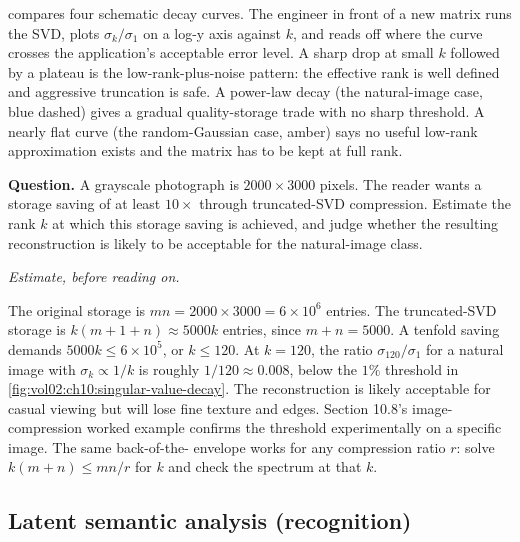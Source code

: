 

 compares four schematic
decay curves. The engineer in front of a new matrix runs the SVD,
plots $\sigma_{k}/\sigma_{1}$ on a log-y axis against $k$, and reads
off where the curve crosses the application's acceptable error level.
A sharp drop at small $k$ followed by a plateau is the
low-rank-plus-noise pattern: the effective rank is well defined and
aggressive truncation is safe. A power-law decay (the natural-image
case, blue dashed) gives a gradual quality-storage trade with no
sharp threshold. A nearly flat curve (the random-Gaussian case,
amber) says no useful low-rank approximation exists and the matrix
has to be kept at full rank.

\begin{estimation}
\textbf{Question.} A grayscale photograph is $2000 \times 3000$
pixels. The reader wants a storage saving of at least $10\times$
through truncated-SVD compression. Estimate the rank $k$ at which
this storage saving is achieved, and judge whether the resulting
reconstruction is likely to be acceptable for the natural-image
class.

\smallskip
\textit{Estimate, before reading on.}

\smallskip
The original storage is $mn = 2000 \times 3000 = 6 \times 10^{6}$
entries. The truncated-SVD storage is $k(m + 1 + n) \approx 5000 k$
entries, since $m + n = 5000$. A tenfold saving demands
$5000 k \leq 6 \times 10^{5}$, or $k \leq 120$. At $k = 120$, the
ratio $\sigma_{120}/\sigma_{1}$ for a natural image with $\sigma_{k}
\propto 1/k$ is roughly $1/120 \approx 0.008$, below the $1\%$
threshold in
\cref{fig:vol02:ch10:singular-value-decay}. The reconstruction is
likely acceptable for casual viewing but will lose fine texture and
edges. Section 10.8's image-compression worked example confirms the
threshold experimentally on a specific image. The same back-of-the-
envelope works for any compression ratio $r$: solve $k(m+n) \leq
mn/r$ for $k$ and check the spectrum at that $k$.
\end{estimation}

\subsection{Latent semantic analysis (recognition)}

